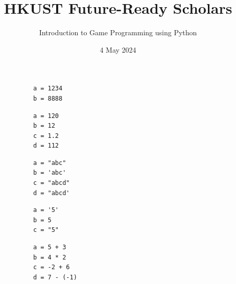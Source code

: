 \documentclass[dvipsnames, svgnames, x11names, handout]{beamer}
\title[HKUST Future-Ready Scholars]{HKUST Future-Ready Scholars}
\subtitle{Introduction to Game Programming using Python}
\author[Game Programming using Python]{}
\date[May 2024]{4 May 2024}
\begin{document}
\frame{\titlepage}


\begin{frame}[fragile]{}
    \begin{center}
        \begin{verbatim}
            a = 1234
            b = 8888
        \end{verbatim}
    \end{center}
\end{frame}

\begin{frame}[fragile]{}
    \begin{center}
        \begin{verbatim}
            a = 120
            b = 12
            c = 1.2
            d = 112
        \end{verbatim}
    \end{center}
\end{frame}

\begin{frame}[fragile]{}
    \begin{center}
        \begin{verbatim}
            a = "abc"
            b = 'abc'
            c = "abcd"
            d = "abcd'
        \end{verbatim}
    \end{center}
\end{frame}

\begin{frame}[fragile]{}
    \begin{center}
        \begin{verbatim}
            a = '5'
            b = 5
            c = "5"
        \end{verbatim}
    \end{center}
\end{frame}

\begin{frame}[fragile]{}
    \begin{center}
        \begin{verbatim}
            a = 5 + 3
            b = 4 * 2
            c = -2 + 6
            d = 7 - (-1)
        \end{verbatim}
    \end{center}
\end{frame}
\end{document}
